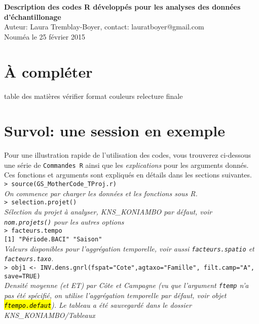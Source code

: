 \documentclass{article}
\begin{document}
{\Large \textbf{Description des codes R développés pour les analyses
    des données d'échantillonage}}\\
Auteur: Laura Tremblay-Boyer, contact: lauratboyer@gmail.com\\
Nouméa le 25 février 2015\\

\section{À compléter}
table des matières
vérifier format couleurs
relecture finale

\clearpage
\tableofcontents

\section{Survol: une session en exemple}
Pour une illustration rapide de l'utilisation des codes, vous
trouverez ci-dessous une série de \texttt{Commandes R} ainsi que les
\emph{explications} pour les arguments donnés. Ces fonctions et
arguments sont expliqués en détails dans les sections suivantes.\\

\texttt{> source(GS\_MotherCode\_TProj.r)} \\
\emph{On commence par charger les données et les fonctions sous R.}\\

\texttt{> selection.projet()}\\
\emph{Sélection du projet à analyser, KNS\_KONIAMBO par défaut, voir
  \texttt{nom.projets()} pour les autres options}\\

\texttt{> facteurs.tempo}\\
\texttt{[1] "Période.BACI" "Saison"}\\
\emph{Valeurs disponibles pour l'aggrégation temporelle, voir aussi
  \texttt{facteurs.spatio} et \texttt{facteurs.taxo}.}\\


\texttt{> obj1 <- INV.dens.gnrl(fspat="Cote",agtaxo="Famille",
  filt.camp="A", save=TRUE)}\\
\emph{Densité moyenne (et ET) par Côte et Campagne (vu que l'argument
\texttt{ftemp} n'a pas été spécifié, on utilise l'aggrégation
temporelle par défaut, voir objet \hl{\texttt{ftempo.defaut}}). Le
tableau a été sauvegardé dans le dossier KNS\_KONIAMBO/Tableaux}\\
\end{document}

